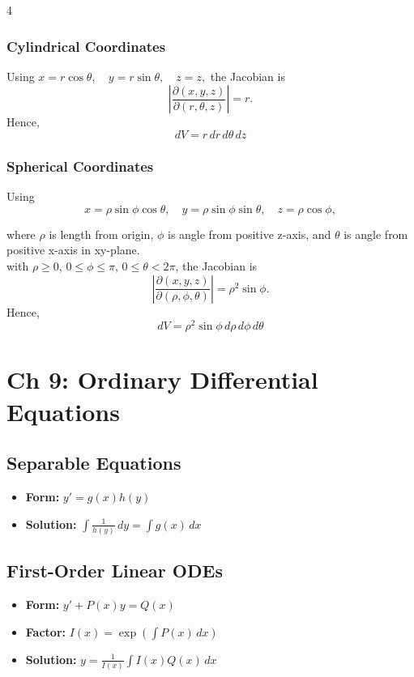\documentclass[8pt, landscape, a4paper]{scrartcl}
\begin{document}
\begin{multicols*}{4}
\subsubsection*{Cylindrical Coordinates}
Using
$
    x = r\cos\theta,\quad y = r\sin\theta,\quad z = z,
$
the Jacobian is
\[
    \left|\frac{\partial(x,y,z)}{\partial(r,\theta,z)}\right| = r.
\]
Hence,
\[
    dV = r\,dr\,d\theta\,dz
\]

\subsubsection*{Spherical Coordinates}
Using
\[
    x = \rho\sin\phi\cos\theta,\quad
    y = \rho\sin\phi\sin\theta,\quad
    z = \rho\cos\phi,
\]

where $\rho$ is length from origin, $\phi$ is angle from positive z-axis, and $\theta$ is angle from positive x-axis in xy-plane.
\\
with $\rho\ge 0$, $0\le \phi\le \pi$, $0\le \theta < 2\pi$, the Jacobian is
\[
    \left|\frac{\partial(x,y,z)}{\partial(\rho,\phi,\theta)}\right| = \rho^2\sin\phi.
\]
Hence,
\[
    dV = \rho^2\sin\phi\,d\rho\,d\phi\,d\theta
\]

\section*{Ch 9: Ordinary Differential Equations}
\subsection*{Separable Equations}
\begin{itemize}
    \item \textbf{Form:} $y' = g(x)h(y)$
    \item \textbf{Solution:} $\int \frac{1}{h(y)} \, dy = \int g(x) \, dx$
\end{itemize}

\subsection*{First-Order Linear ODEs}
\begin{itemize}
    \item \textbf{Form:} $y' + P(x)y = Q(x)$
    \item \textbf{Factor:} $I(x) = \exp\left(\int P(x) \, dx\right)$
    \item \textbf{Solution:} $y = \frac{1}{I(x)} \int I(x)Q(x) \, dx$
\end{itemize}


\end{multicols*}
\end{document}
